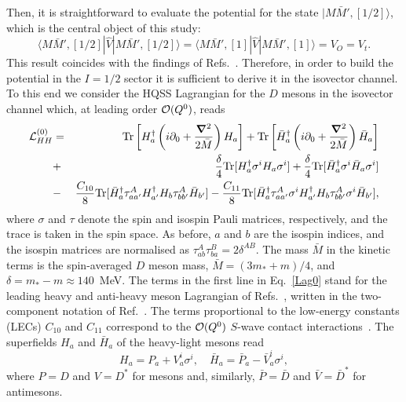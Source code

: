 \documentclass[preprint,12pt,3p]{elsarticle}
\newcommand{\Hb}{\bar{H}}
\newcommand{\nn}{\nonumber}
\newcommand{\be}{\begin{equation}}
\newcommand{\ee}{\end{equation}}
\newcommand{\bea}{\begin{eqnarray}}
\newcommand{\eea}{\end{eqnarray}}
\def\vec#1{\boldsymbol{#1}}
\begin{document}
Then, it is straightforward to evaluate the potential for the state $|M\bar{M}',[1/2]\rangle$, which is the central object of this study:
\be
\langle M\bar{M}',[1/2]|\hat{V}|M\bar{M}',[1/2]\rangle=\langle M\bar{M}',[1]|\hat{V}|M\bar{M}',[1]\rangle=V_O=V_t.
\label{su3pot2}
\ee
This result coincides with the findings of
Refs.~\cite{HidalgoDuque:2012pq,Yang:2020nrt}. Therefore, in order to
build the potential in the $I=1/2$ sector it is sufficient to derive
it in the isovector channel. To this end we consider the HQSS Lagrangian for the $D$ mesons in the isovector channel which, at leading order ${\cal O}(Q^0)$, reads \cite{Mehen:2011yh}
\bea
{\cal L}^{(0)}_{HH}&=&{\rm Tr}\left[H^\dagger_a \left(i \partial_0 +\frac{\vec\nabla^2}{2 \bar{M}}\right) H_a\right]
+{\rm Tr}\left[\Hb^\dagger_a\left(i\partial_0+\frac{\vec\nabla^2}{2\bar{M}}\right)\Hb_a\right] \nn \\ 
&+&\frac{\delta}{4}{\rm Tr}[H^\dagger_a\sigma^i H_a \sigma^i]
+\frac{\delta}{4}{\rm Tr}[\Hb^\dagger_a\sigma^i\Hb_a \sigma^i]\label{Lag0}\\
&-&\frac{C_{10}}{8}{\rm Tr}[\bar{H}^\dagger_a\tau^A_{aa^\prime}H^\dagger_{a^\prime}H_b\tau_{bb^\prime}^A\bar{H}_{b^\prime}] 
-\frac{C_{11}}{8}{\rm Tr}[\bar{H}^\dagger_a\tau^A_{aa^\prime}\sigma^i H^\dagger_{a^\prime}H_b\tau_{bb^\prime}^A\sigma^i\bar{H}_{b^\prime}],\nn
\eea
where $\sigma$ and $\tau$ denote the spin and isospin Pauli matrices, respectively, and the trace is taken in the spin space. As before, $a$ and $b$ are the isospin indices, and the isospin matrices are normalised as $\tau^A_{ab} \tau^B_{ba} =2\delta^{AB}$. The mass $\bar{M}$ in the kinetic terms is the spin-averaged $D$ meson mass, 
$\bar{M}=(3m_*+m)/4$, and $\delta=m_*-m\approx 140$~MeV. The terms in the first line in Eq.~\eqref{Lag0} stand for the leading heavy and anti-heavy meson Lagrangian of Refs.~\cite{Wise:1992hn,Burdman:1992gh,Yan:1992gz},
written in the two-component notation of Ref.~\cite{Hu:2005gf}. 
The terms proportional to the low-energy constants (LECs) $C_{10}$ and $C_{11}$ correspond to the ${\cal O}(Q^0)$ $S$-wave contact interactions~\cite{Mehen:2011yh,AlFiky:2005jd}.
The superfields $H_a$ and $\bar{H}_a$ of the heavy-light mesons read
\be
H_a=P_a+V^i_a\sigma^i,\quad\bar{H}_a=\bar{P}_a-\bar{V}^i_a\sigma^i,
\label{Hs}
\ee 
where $P=D$ and $V=D^*$ for mesons and, similarly, $\bar{P}=\bar{D}$ and $\bar{V}=\bar{D}^*$ for antimesons. 
\end{document}
